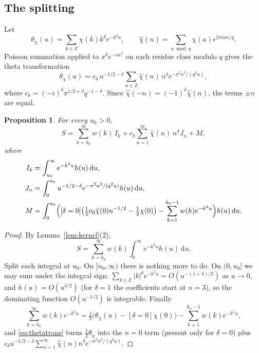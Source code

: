 \documentclass[11pt,reqno]{amsart}
\newtheorem{proposition}[theorem]{Proposition}
\theoremstyle{definition}
\theoremstyle{remark}
\newcommand{\dd}{\,\mathrm{d}}
\newcommand{\ZZ}{\mathbb{Z}}
\begin{document}
\subsection{The splitting}
Let
\[
  \theta_\chi(u) = \sum_{k \in \ZZ} \chi(k) k^\delta e^{-k^2u}, \qquad
  \hat\chi(n) = \sum_{a \bmod q} \chi(a) e^{2\pi i a n/q}.
\]
Poisson summation applied to $x^\delta e^{-ux^2}$ on each residue class modulo $q$ gives the theta transformation
\begin{equation}\label{eq:thetatrans}
  \theta_\chi(u) = c_\delta\, u^{-1/2-\delta} \sum_{n \in \ZZ} \hat\chi(n)\, n^\delta e^{-\pi^2 n^2/(q^2u)},
\end{equation}
where $c_\delta = (-i)^\delta \pi^{1/2+\delta} q^{-1-\delta}$.
Since $\hat\chi(-n) = (-1)^\delta\hat\chi(n)$, the terms $\pm n$ are equal.

\begin{proposition}\label{prop:split}
For every $u_0 > 0$,
\[
  S = \sum_{k=k_0}^{\infty} w(k)\, I_k + c_\delta \sum_{n=1}^{\infty} \hat\chi(n)\, n^\delta J_n + M,
\]
where
\begin{align*}
  I_k &= \int_{u_0}^\infty e^{-k^2u} h(u)\dd u, \\
  J_n &= \int_0^{u_0} u^{-1/2-\delta} e^{-\pi^2n^2/(q^2u)} h(u)\dd u, \\
  M &= \int_0^{u_0} \Bigl( [\delta = 0]\bigl(\tfrac12 c_0\hat\chi(0) u^{-1/2} - \tfrac12\chi(0)\bigr)
       - \sum_{k=1}^{k_0-1} w(k) e^{-k^2u} \Bigr) h(u)\dd u .
\end{align*}
\end{proposition}

\begin{proof}
By Lemma~\ref{lem:kernel}(2),
\[
  S = \sum_{k=k_0}^{\infty} w(k)\int_0^\infty e^{-k^2u}h(u)\dd u.
\]
Split each integral at $u_0$. On $[u_0,\infty)$ there is nothing more to do. On $(0, u_0]$ we may sum under the
integral sign: $\sum_{k\in\ZZ} |k|^\delta e^{-k^2u} = O(u^{-(1+\delta)/2})$ as $u \to 0$, and $h(u) = O(u^{\delta/2})$
(for $\delta = 1$ the coefficients start at $n = 3$), so the dominating function $O(u^{-1/2})$ is integrable. Finally
\[
  \sum_{k=k_0}^{\infty} w(k) e^{-k^2u} = \tfrac12\bigl(\theta_\chi(u) - [\delta=0]\chi(0)\bigr) - \sum_{k=1}^{k_0-1} w(k)e^{-k^2u},
\]
and \eqref{eq:thetatrans} turns $\frac12\theta_\chi$ into the $n = 0$ term (present only for $\delta = 0$)
plus $c_\delta u^{-1/2-\delta}\sum_{n=1}^{\infty}\hat\chi(n)n^\delta e^{-\pi^2n^2/(q^2u)}$.
\end{proof}
\end{document}
